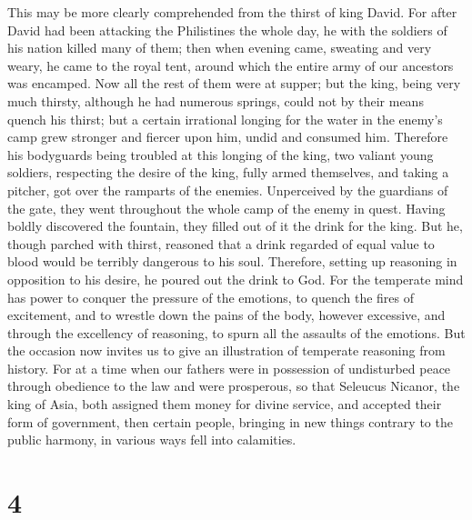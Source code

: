  This may be more clearly comprehended from the thirst of
king David.  For after David had been attacking the
Philistines the whole day, he with the soldiers of his nation killed
many of them;  then when evening came, sweating and very
weary, he came to the royal tent, around which the entire army of our
ancestors was encamped.  Now all the rest of them were at
supper;  but the king, being very much thirsty, although he
had numerous springs, could not by their means quench his thirst;
 but a certain irrational longing for the water in the
enemy's camp grew stronger and fiercer upon him, undid and consumed him.
 Therefore his bodyguards being troubled at this longing of
the king, two valiant young soldiers, respecting the desire of the king,
fully armed themselves, and taking a pitcher, got over the ramparts of
the enemies.  Unperceived by the guardians of the gate,
they went throughout the whole camp of the enemy in quest. 
Having boldly discovered the fountain, they filled out of it the drink
for the king.  But he, though parched with thirst, reasoned
that a drink regarded of equal value to blood would be terribly
dangerous to his soul.  Therefore, setting up reasoning in
opposition to his desire, he poured out the drink to God. 
For the temperate mind has power to conquer the pressure of the
emotions, to quench the fires of excitement,  and to
wrestle down the pains of the body, however excessive, and through the
excellency of reasoning, to spurn all the assaults of the emotions.
 But the occasion now invites us to give an illustration of
temperate reasoning from history.  For at a time when our
fathers were in possession of undisturbed peace through obedience to the
law and were prosperous, so that Seleucus Nicanor, the king of Asia,
both assigned them money for divine service, and accepted their form of
government,  then certain people, bringing in new things
contrary to the public harmony, in various ways fell into calamities.

\hypertarget{section-3}{%
\section{4}\label{section-3}}

